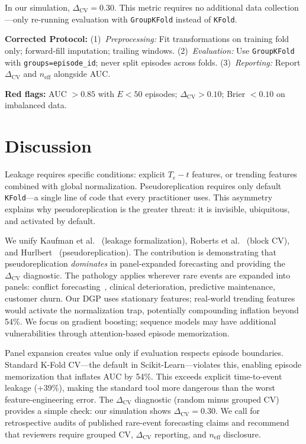 \documentclass[acmsmall,nonacm]{acmart}
\newcommand{\1}{\mathbbm{1}}
\newcommand{\DeltaCV}{\Delta_{\text{CV}}}
\begin{document}
In our simulation, $\DeltaCV = 0.30$. This metric requires no additional data collection---only re-running evaluation with \texttt{GroupKFold} instead of \texttt{KFold}.

\textbf{Corrected Protocol:} (1)~\textit{Preprocessing:} Fit transformations on training fold only; forward-fill imputation; trailing windows. (2)~\textit{Evaluation:} Use \texttt{GroupKFold} with \texttt{groups=episode\_id}; never split episodes across folds. (3)~\textit{Reporting:} Report $\DeltaCV$ and $n_{\text{eff}}$ alongside AUC.

\textbf{Red flags:} AUC $> 0.85$ with $E < 50$ episodes; $\DeltaCV > 0.10$; Brier $< 0.10$ on imbalanced data.

\section{Discussion}
Leakage requires specific conditions: explicit $T_e - t$ features, or trending features combined with global normalization. Pseudoreplication requires only default \texttt{KFold}---a single line of code that every practitioner uses. This asymmetry explains why pseudoreplication is the greater threat: it is invisible, ubiquitous, and activated by default.

 We unify Kaufman et al.~\cite{kaufman2012} (leakage formalization), Roberts et al.~\cite{roberts2017} (block CV), and Hurlbert~\cite{hurlbert1984} (pseudoreplication). The contribution is demonstrating that pseudoreplication \textit{dominates} in panel-expanded forecasting and providing the $\DeltaCV$ diagnostic. The pathology applies wherever rare events are expanded into panels: conflict forecasting~\cite{muchlinski2016,hegre2019}, clinical deterioration, predictive maintenance, customer churn. Our DGP uses stationary features; real-world trending features would activate the normalization trap, potentially compounding inflation beyond 54\%. We focus on gradient boosting; sequence models may have additional vulnerabilities through attention-based episode memorization.

Panel expansion creates value only if evaluation respects episode boundaries. Standard K-Fold CV---the default in Scikit-Learn---violates this, enabling episode memorization that inflates AUC by 54\%. This exceeds explicit time-to-event leakage (+39\%), making the standard tool more dangerous than the worst feature-engineering error. The $\DeltaCV$ diagnostic (random minus grouped CV) provides a simple check: our simulation shows $\DeltaCV = 0.30$. We call for retrospective audits of published rare-event forecasting claims and recommend that reviewers require grouped CV, $\DeltaCV$ reporting, and $n_{\text{eff}}$ disclosure.



\end{document}
